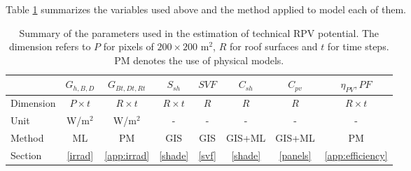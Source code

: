 Table \ref{tab:vars} summarizes the variables used above and the method applied to model each of them. 

\begin{table}[tb]
\centering
\footnotesize
\caption{Summary of the parameters used in the estimation of technical RPV potential. The dimension refers to $P$ for pixels of $200 \times 200$ m$^2$, $R$ for roof surfaces and $t$ for time steps. PM denotes the use of physical models.}
\label{tab:vars}
\begin{tabular} {lccccccc} %
\hline 
  & $G_{h,B,D}$ & $G_{Bt,Dt,Rt}$ & $S_{sh}$   & $\mathit{SVF}$  & $C_{sh}$  & $C_{\mathit{pv}}$ & $\eta_{PV}, \mathit{PF}$     
  \\
\hline 
Dimension & $P \times t$ & $R \times t$ & $R \times t$ & $R$   & $R$     & $R$      & $R \times t$  
\\
Unit     & W/m$^2$    & W/m$^2$  & -                          & -                  & -                    & -                     & -                             
\\
Method      & ML & PM & GIS & GIS & GIS+ML & GIS+ML & PM \\
Section      & \ref{irrad}  & \ref{app:irrad}     & \ref{shade}       & \ref{svf} & \ref{shade} & \ref{panels} & \ref{app:efficiency} 
\\  
\hline 
\end{tabular}
\end{table}

